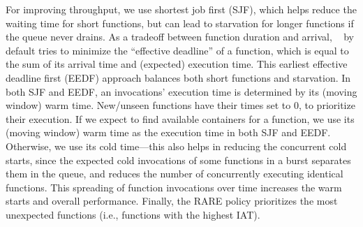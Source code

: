 For improving throughput, we use shortest job first (SJF), which helps reduce the waiting time for short functions, but can lead to starvation for longer functions if the queue never drains. 
As a tradeoff between function duration and arrival, \sysname~ by default tries to minimize the ``effective deadline'' of a function, which is equal to the sum of its arrival time and (expected) execution time.
This earliest effective deadline first (EEDF) approach balances both short functions and starvation.
In both SJF and EEDF, an invocations' execution time is determined by its (moving window) warm time.
New/unseen functions have their times set to 0, to prioritize their execution.  
If we expect to find available containers for a function, we use its (moving window) warm time as the execution time in both SJF and EEDF.
Otherwise, we use its cold time---this also helps in reducing the concurrent cold starts, since the expected cold invocations of some functions in a burst separates them in the queue, and reduces the number of concurrently executing identical functions.
This spreading of function invocations over time increases the warm starts and overall performance. 
%
Finally, the RARE policy prioritizes the most unexpected functions (i.e., functions with the highest IAT). 





